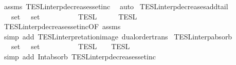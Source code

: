 \begin{isabellebody}
%
\isadelimproof
%
\endisadelimproof
%
\isatagproof
{}\isamarkupfalse%
\ assms\ TESL{\isacharunderscore}interp{\isacharunderscore}decreases{\isacharunderscore}setinc\ \isamarkupfalse%
\ auto%
\endisatagproof
{\isafoldproof}%
%
\isadelimproof
\isanewline
%
\endisadelimproof
\isanewline
{}\isamarkupfalse%
\ TESL{\isacharunderscore}interp{\isacharunderscore}decreases{\isacharunderscore}add{\isacharunderscore}tail{\isacharcolon}\isanewline
\ \ \ {\isacartoucheopen}set\ {\isasymPhi}\ {\isasymsubseteq}\ set\ {\isasymPhi}{\isacharprime}{\isacartoucheclose}\isanewline
\ \ \ \ \ {\isacartoucheopen}{\isasymlbrakk}{\isasymlbrakk}\ {\isasymPhi}\ {\isacharat}\ {\isacharbrackleft}{\isasymphi}{\isacharbrackright}\ {\isasymrbrakk}{\isasymrbrakk}\isactrlsub T\isactrlsub E\isactrlsub S\isactrlsub L\ {\isasymsupseteq}\ {\isasymlbrakk}{\isasymlbrakk}\ {\isasymPhi}{\isacharprime}\ {\isacharat}\ {\isacharbrackleft}{\isasymphi}{\isacharbrackright}\ {\isasymrbrakk}{\isasymrbrakk}\isactrlsub T\isactrlsub E\isactrlsub S\isactrlsub L{\isacartoucheclose}\isanewline
%
\isadelimproof
%
\endisadelimproof
%
\isatagproof
{}\isamarkupfalse%
\ TESL{\isacharunderscore}interp{\isacharunderscore}decreases{\isacharunderscore}setinc{\isacharbrackleft}OF\ assms{\isacharbrackright}\ \isanewline
\ \ \isamarkupfalse%
\ {\isacharparenleft}simp\ add{\isacharcolon}\ TESL{\isacharunderscore}interpretation{\isacharunderscore}image\ dual{\isacharunderscore}order{\isachardot}trans{\isacharparenright}%
\endisatagproof
{\isafoldproof}%
%
\isadelimproof
\isanewline
%
\endisadelimproof
\isanewline
{}\isamarkupfalse%
\ TESL{\isacharunderscore}interp{\isacharunderscore}absorb{}{\isacharcolon}\isanewline
\ \ \ {\isacartoucheopen}set\ {\isasymPhi}\ {\isasymsubseteq}\ set\ {\isasymPhi}\isanewline
\ \ \ \ \ {\isacartoucheopen}{\isasymlbrakk}{\isasymlbrakk}\ {\isasymPhi}\ {\isacharat}\ {\isasymPhi}\ {\isasymrbrakk}{\isasymrbrakk}\isactrlsub T\isactrlsub E\isactrlsub S\isactrlsub L\ {\isacharequal}\ {\isasymlbrakk}{\isasymlbrakk}\ {\isasymPhi}\ {\isasymrbrakk}{\isasymrbrakk}\isactrlsub T\isactrlsub E\isactrlsub S\isactrlsub L{\isacartoucheclose}\isanewline
%
\isadelimproof
%
\endisadelimproof
%
\isatagproof
{}\isamarkupfalse%
\ {\isacharparenleft}simp\ add{\isacharcolon}\ Int{\isacharunderscore}absorb{}\ TESL{\isacharunderscore}interp{\isacharunderscore}decreases{\isacharunderscore}setinc\isanewline

\end{isabellebody}
